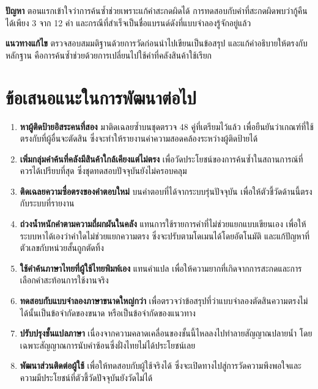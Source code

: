 \textbf{ปัญหา} ตอนแรกเข้าใจว่าการค้นซ้ำช่วยเพราะแก้คำสะกดผิดได้ การทดสอบกับคำที่สะกดผิดพบว่ากู้คืนได้เพียง 3 จาก 12 คำ และกรณีที่สำเร็จเป็นชื่อแบรนด์ดังที่แบบจำลองรู้จักอยู่แล้ว

\textbf{แนวทางแก้ไข} ตรวจสอบสมมติฐานด้วยการวัดก่อนนำไปเขียนเป็นข้อสรุป และแก้คำอธิบายให้ตรงกับหลักฐาน คือการค้นซ้ำช่วยด้วยการเปลี่ยนไปใช้คำที่คลังสินค้าใช้เรียก

\section{ข้อเสนอแนะในการพัฒนาต่อไป}

\begin{enumerate}[label=\arabic*)]
    \item \textbf{หาผู้ติดป้ายอิสระคนที่สอง} มาติดเฉลยซ้ำบนชุดตรวจ 48 คู่ที่เตรียมไว้แล้ว เพื่อยืนยันว่าเกณฑ์ที่ใช้ตรงกับที่ผู้อื่นจะตัดสิน ซึ่งจะทำให้รายงานค่าความสอดคล้องระหว่างผู้ติดป้ายได้
    \item \textbf{เพิ่มกลุ่มคำค้นที่คลังมีสินค้าใกล้เคียงแต่ไม่ตรง} เพื่อวัดประโยชน์ของการค้นซ้ำในสถานการณ์ที่ควรได้เปรียบที่สุด ซึ่งชุดทดสอบปัจจุบันยังไม่ครอบคลุม
    \item \textbf{ติดเฉลยความซื่อตรงของคำตอบใหม่} บนคำตอบที่ได้จากระบบรุ่นปัจจุบัน เพื่อให้ตัวชี้วัดด้านนี้ตรงกับระบบที่รายงาน
    \item \textbf{ถ่วงน้ำหนักคำตามความถี่ผกผันในคลัง} แทนการใช้รายการคำที่ไม่ช่วยแยกแบบเขียนเอง เพื่อให้ระบบหาได้เองว่าคำใดไม่ช่วยแยกความตรง ซึ่งจะปรับตามโดเมนได้โดยอัตโนมัติ และแก้ปัญหาที่ตัวเลขกับหน่วยสั้นถูกตัดทิ้ง
    \item \textbf{ใช้คำค้นภาษาไทยที่ผู้ใช้ไทยพิมพ์เอง} แทนคำแปล เพื่อให้ความยากที่เกิดจากการสะกดและการเลือกคำสะท้อนการใช้งานจริง
    \item \textbf{ทดสอบกับแบบจำลองภาษาขนาดใหญ่กว่า} เพื่อตรวจว่าข้อสรุปที่ว่าแบบจำลองตัดสินความตรงไม่ได้นั้นเป็นข้อจำกัดของขนาด หรือเป็นข้อจำกัดของแนวทาง
    \item \textbf{ปรับปรุงชั้นแปลภาษา} เนื่องจากความคลาดเคลื่อนของชั้นนี้ไหลลงไปทำลายสัญญาณปลายน้ำ โดยเฉพาะสัญญาณการนับคำซ้อนซึ่งฝั่งไทยไม่ได้ประโยชน์เลย
    \item \textbf{พัฒนาส่วนติดต่อผู้ใช้} เพื่อให้ทดสอบกับผู้ใช้จริงได้ ซึ่งจะเปิดทางไปสู่การวัดความพึงพอใจและความมีประโยชน์ที่ตัวชี้วัดปัจจุบันยังวัดไม่ได้
\end{enumerate}
